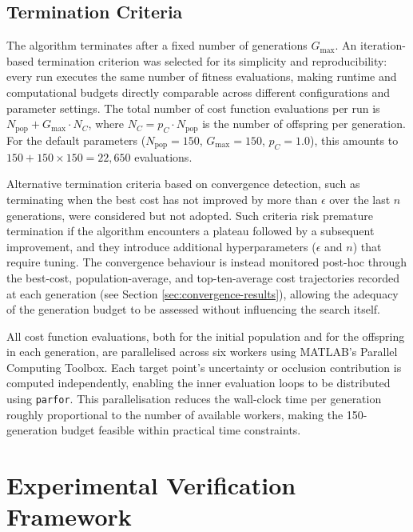 \subsection{Termination Criteria}
\label{sec:termination}

The algorithm terminates after a fixed number of generations $G_{\max}$. An iteration-based termination criterion was selected for its simplicity and reproducibility: every run executes the same number of fitness evaluations, making runtime and computational budgets directly comparable across different configurations and parameter settings. The total number of cost function evaluations per run is $N_{\text{pop}} + G_{\max} \cdot N_C$, where $N_C = p_C \cdot N_{\text{pop}}$ is the number of offspring per generation. For the default parameters ($N_{\text{pop}} = 150$, $G_{\max} = 150$, $p_C = 1.0$), this amounts to $150 + 150 \times 150 = 22{,}650$ evaluations.

Alternative termination criteria based on convergence detection, such as terminating when the best cost has not improved by more than $\epsilon$ over the last $n$ generations, were considered but not adopted. Such criteria risk premature termination if the algorithm encounters a plateau followed by a subsequent improvement, and they introduce additional hyperparameters ($\epsilon$ and $n$) that require tuning. The convergence behaviour is instead monitored post-hoc through the best-cost, population-average, and top-ten-average cost trajectories recorded at each generation (see Section \ref{sec:convergence-results}), allowing the adequacy of the generation budget to be assessed without influencing the search itself.

All cost function evaluations, both for the initial population and for the offspring in each generation, are parallelised across six workers using MATLAB's Parallel Computing Toolbox. Each target point's uncertainty or occlusion contribution is computed independently, enabling the inner evaluation loops to be distributed using \texttt{parfor}. This parallelisation reduces the wall-clock time per generation roughly proportional to the number of available workers, making the 150-generation budget feasible within practical time constraints.

\section{Experimental Verification Framework}
\label{sec:verification}

